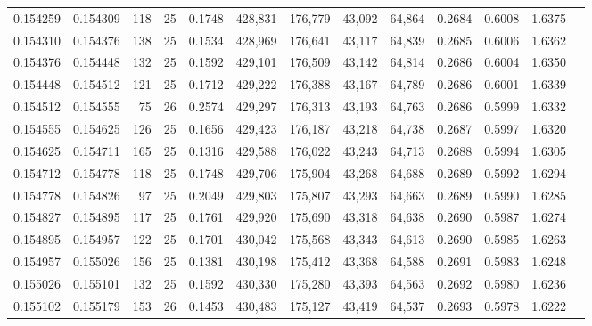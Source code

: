 \begin{tabular}{rrrrrrrrrrrrr}
0.154259 & 0.154309 &   118 &  25 &                                     0.1748 & 428,831 & 176,779 &  43,092 &  64,864 & 0.2684 & 0.6008 & 1.6375 \\
0.154310 & 0.154376 &   138 &  25 &                                     0.1534 & 428,969 & 176,641 &  43,117 &  64,839 & 0.2685 & 0.6006 & 1.6362 \\
0.154376 & 0.154448 &   132 &  25 &                                     0.1592 & 429,101 & 176,509 &  43,142 &  64,814 & 0.2686 & 0.6004 & 1.6350 \\
0.154448 & 0.154512 &   121 &  25 &                                     0.1712 & 429,222 & 176,388 &  43,167 &  64,789 & 0.2686 & 0.6001 & 1.6339 \\
0.154512 & 0.154555 &    75 &  26 &                                     0.2574 & 429,297 & 176,313 &  43,193 &  64,763 & 0.2686 & 0.5999 & 1.6332 \\
0.154555 & 0.154625 &   126 &  25 &                                     0.1656 & 429,423 & 176,187 &  43,218 &  64,738 & 0.2687 & 0.5997 & 1.6320 \\
0.154625 & 0.154711 &   165 &  25 &                                     0.1316 & 429,588 & 176,022 &  43,243 &  64,713 & 0.2688 & 0.5994 & 1.6305 \\
0.154712 & 0.154778 &   118 &  25 &                                     0.1748 & 429,706 & 175,904 &  43,268 &  64,688 & 0.2689 & 0.5992 & 1.6294 \\
0.154778 & 0.154826 &    97 &  25 &                                     0.2049 & 429,803 & 175,807 &  43,293 &  64,663 & 0.2689 & 0.5990 & 1.6285 \\
0.154827 & 0.154895 &   117 &  25 &                                     0.1761 & 429,920 & 175,690 &  43,318 &  64,638 & 0.2690 & 0.5987 & 1.6274 \\
0.154895 & 0.154957 &   122 &  25 &                                     0.1701 & 430,042 & 175,568 &  43,343 &  64,613 & 0.2690 & 0.5985 & 1.6263 \\
0.154957 & 0.155026 &   156 &  25 &                                     0.1381 & 430,198 & 175,412 &  43,368 &  64,588 & 0.2691 & 0.5983 & 1.6248 \\
0.155026 & 0.155101 &   132 &  25 &                                     0.1592 & 430,330 & 175,280 &  43,393 &  64,563 & 0.2692 & 0.5980 & 1.6236 \\
0.155102 & 0.155179 &   153 &  26 &                                     0.1453 & 430,483 & 175,127 &  43,419 &  64,537 & 0.2693 & 0.5978 & 1.6222 \\

\end{tabular}
